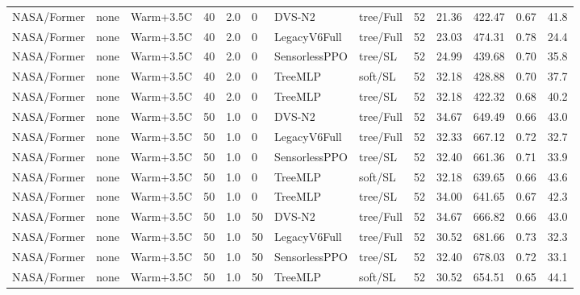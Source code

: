 \documentclass[10pt,a4paper]{article}
\begin{document}
\begin{landscape}
\begin{longtable}{llllllllrrrrr}
NASA/Former & none & Warm+3.5C & 40 & 2.0 & 0 & DVS-N2 & tree/Full & 52 & 21.36 & 422.47 & 0.67 & 41.8 \\

NASA/Former & none & Warm+3.5C & 40 & 2.0 & 0 & LegacyV6Full & tree/Full & 52 & 23.03 & 474.31 & 0.78 & 24.4 \\

NASA/Former & none & Warm+3.5C & 40 & 2.0 & 0 & SensorlessPPO & tree/SL & 52 & 24.99 & 439.68 & 0.70 & 35.8 \\

NASA/Former & none & Warm+3.5C & 40 & 2.0 & 0 & TreeMLP & soft/SL & 52 & 32.18 & 428.88 & 0.70 & 37.7 \\

NASA/Former & none & Warm+3.5C & 40 & 2.0 & 0 & TreeMLP & tree/SL & 52 & 32.18 & 422.32 & 0.68 & 40.2 \\

NASA/Former & none & Warm+3.5C & 50 & 1.0 & 0 & DVS-N2 & tree/Full & 52 & 34.67 & 649.49 & 0.66 & 43.0 \\

NASA/Former & none & Warm+3.5C & 50 & 1.0 & 0 & LegacyV6Full & tree/Full & 52 & 32.33 & 667.12 & 0.72 & 32.7 \\

NASA/Former & none & Warm+3.5C & 50 & 1.0 & 0 & SensorlessPPO & tree/SL & 52 & 32.40 & 661.36 & 0.71 & 33.9 \\

NASA/Former & none & Warm+3.5C & 50 & 1.0 & 0 & TreeMLP & soft/SL & 52 & 32.18 & 639.65 & 0.66 & 43.6 \\

NASA/Former & none & Warm+3.5C & 50 & 1.0 & 0 & TreeMLP & tree/SL & 52 & 34.00 & 641.65 & 0.67 & 42.3 \\

NASA/Former & none & Warm+3.5C & 50 & 1.0 & 50 & DVS-N2 & tree/Full & 52 & 34.67 & 666.82 & 0.66 & 43.0 \\

NASA/Former & none & Warm+3.5C & 50 & 1.0 & 50 & LegacyV6Full & tree/Full & 52 & 30.52 & 681.66 & 0.73 & 32.3 \\

NASA/Former & none & Warm+3.5C & 50 & 1.0 & 50 & SensorlessPPO & tree/SL & 52 & 32.40 & 678.03 & 0.72 & 33.1 \\

NASA/Former & none & Warm+3.5C & 50 & 1.0 & 50 & TreeMLP & soft/SL & 52 & 30.52 & 654.51 & 0.65 & 44.1 \\


\end{longtable}
\end{landscape}
\end{document}
